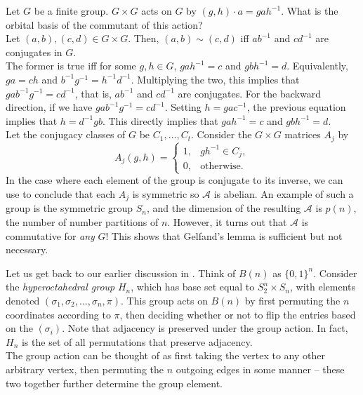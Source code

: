 	\begin{fex}
		Let $G$ be a finite group. $G \times G$ acts on $G$ by $(g,h) \cdot a = gah^{-1}$. What is the orbital basis of the commutant of this action?\\
		Let $(a,b),(c,d) \in G \times G$. Then, $(a,b) \sim (c,d)$ iff $ab^{-1}$ and $cd^{-1}$ are conjugates in $G$.\\
		The former is true iff for some $g,h \in G$, $gah^{-1} = c$ and $gbh^{-1} = d$. Equivalently, $ga = ch$ and $b^{-1}g^{-1} = h^{-1}d^{-1}$. Multiplying the two, this implies that $gab^{-1}g^{-1} = cd^{-1}$, that is, $ab^{-1}$ and $cd^{-1}$ are conjugates. For the backward direction, if we have $gab^{-1}g^{-1} = cd^{-1}$. Setting $h = gac^{-1}$, the previous equation implies that $h = d^{-1}gb$. This directly implies that $gah^{-1} = c$ and $gbh^{-1} = d$.\\
		Let the conjugacy classes of $G$ be $C_1,\ldots,C_t$. Consider the $G \times G$ matrices $A_j$ by
		\[ A_j(g,h) = \begin{cases} 1, & gh^{-1} \in C_j, \\ 0, & \text{otherwise.} \end{cases} \]
		In the case where each element of the group is conjugate to its inverse, we can use  to conclude that each $A_j$ is symmetric so $\mathcal{A}$ is abelian. An example of such a group is the symmetric group $S_n$, and the dimension of the resulting $\mathcal{A}$ is $p(n)$, the number of number partitions of $n$. However, it turns out that $\mathcal{A}$ is commutative for \emph{any} $G$! This shows that Gelfand's lemma is sufficient but not necessary.
	\end{fex}

	Let us get back to our earlier discussion in . Think of $B(n)$ as $\{0,1\}^n$. Consider the \emph{hyperoctahedral group} $H_n$, which has base set equal to $S_2^n \times S_n$, with elements denoted $(\sigma_1,\sigma_2,\ldots,\sigma_n,\pi)$. This group acts on $B(n)$ by first permuting the $n$ coordinates according to $\pi$, then deciding whether or not to flip the entries based on the $(\sigma_i)$. Note that adjacency is preserved under the group action. In fact, $H_n$ is the set of all permutations that preserve adjacency.\\
	The group action can be thought of as first taking the vertex to any other arbitrary vertex, then permuting the $n$ outgoing edges in some manner -- these two together further determine the group element.\\

